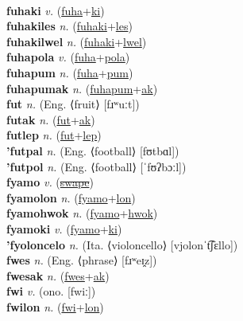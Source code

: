  \label{fuhalwel} \\
\textbf{fuhaki} \textit{v.} (\hyperref[fuha]{fuha}+\hyperref[ki]{ki})
 \label{fuhaki} \\
\textbf{fuhakiles} \textit{n.} (\hyperref[fuhaki]{fuhaki}+\hyperref[les]{les})
 \label{fuhakiles} \\
\textbf{fuhakilwel} \textit{n.} (\hyperref[fuhaki]{fuhaki}+\hyperref[lwel]{lwel})
 \label{fuhakilwel} \\
\textbf{fuhapola} \textit{v.} (\hyperref[fuha]{fuha}+\hyperref[pola]{pola})
 \label{fuhapola} \\
\textbf{fuhapum} \textit{n.} (\hyperref[fuha]{fuha}+\hyperref[pum]{pum})
 \label{fuhapum} \\
\textbf{fuhapumak} \textit{n.} (\hyperref[fuhapum]{fuhapum}+\hyperref[ak]{ak})
 \label{fuhapumak} \\
\textbf{fut} \textit{n.} (Eng. ⟨fruit⟩ [fɹʷuːt])
 \label{fut} \\
\textbf{futak} \textit{n.} (\hyperref[fut]{fut}+\hyperref[ak]{ak})
 \label{futak} \\
\textbf{futlep} \textit{n.} (\hyperref[fut]{fut}+\hyperref[lep]{lep})
 \label{futlep} \\
\textbf{'futpal} \textit{n.} (Eng. ⟨football⟩ [fʊtbɑl])
 \label{'futpal} \\
\textbf{'futpol} \textit{n.} (Eng. ⟨football⟩ [ˈfʊʔbɔːl])
 \label{'futpol} \\
\textbf{fyamo} \textit{v.} (\hyperref[swape]{\sout{swape}})
 \label{fyamo} \\
\textbf{fyamolon} \textit{n.} (\hyperref[fyamo]{fyamo}+\hyperref[lon]{lon})
 \label{fyamolon} \\
\textbf{fyamohwok} \textit{n.} (\hyperref[fyamo]{fyamo}+\hyperref[hwok]{hwok})
 \label{fyamohwok} \\
\textbf{fyamoki} \textit{v.} (\hyperref[fyamo]{fyamo}+\hyperref[ki]{ki})
 \label{fyamoki} \\
\textbf{'fyoloncelo} \textit{n.} (Ita. ⟨violoncello⟩ [vjolonˈt͡ʃɛllo])
 \label{'fyoloncelo} \\
\textbf{fwes} \textit{n.} (Eng. ⟨phrase⟩ [fɹʷeɪ̯z])
 \label{fwes} \\
\textbf{fwesak} \textit{n.} (\hyperref[fwes]{fwes}+\hyperref[ak]{ak})
 \label{fwesak} \\
\textbf{fwi} \textit{v.} (ono. [fwiː])
 \label{fwi} \\
\textbf{fwilon} \textit{n.} (\hyperref[fwi]{fwi}+\hyperref[lon]{lon})
 \label{fwilon} 

